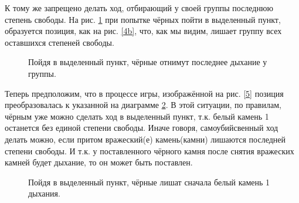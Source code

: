 \documentclass[14pt,a4paper]{extarticle}
\newcommand{\stone}[3]{\filldraw[color=black, fill=#3, very thick](#1,#2) circle(0.45);}
\newcommand{\territory}[3]{\filldraw[color=black, fill=#3, very thick](#1, #2) circle(0.125);}
\newcommand{\stonelabel}[4]{\node[text=#3] at (#1,#2) {#4};}
\begin{document}
К тому же запрещено делать ход, отбирающий у своей группы последнюю степень свободы. На рис. \ref{6} при попытке чёрных пойти в выделенный пункт, образуется позиция, как на рис. \ref{4b}, что, как мы видим, лишает группу всех оставшихся степеней свободы.


\newpage


\begin{figure}[h!]
    \centering

    \caption{Пойдя в выделенный пункт, чёрные отнимут последнее дыхание у группы.}
    \label{6}
\end{figure}

Теперь предположим, что в процессе игры, изображённой на рис. \ref{5} позиция преобразовалась к указанной на диаграмме \ref{7}. В этой ситуации, по правилам, чёрным уже можно сделать ход в выделенный пункт, т.к. белый камень 1 останется без единой степени свободы. Иначе говоря, самоубийсвенный ход делать можно, если притом вражеский(е) камень(камни) лишаются последней степени свободы. И т.к. у поставленного чёрного камня после снятия вражеских камней будет дыхание, то он может быть поставлен.

\begin{figure}[h!]
    \centering
    \caption{Пойдя в выделенный пункт, чёрные лишат сначала белый камень 1 дыхания.}
    \label{7}
\end{figure}
\end{document}
